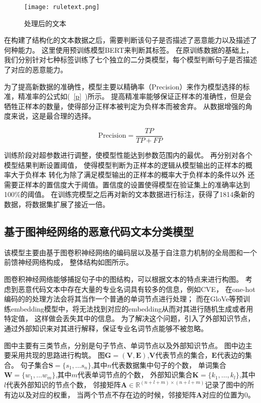 \begin{figure}[htb]
	\centering
	\texttt{[image: ruletext.png]}
	\caption{处理后的文本}
	\label{fig:ruletext}
\end{figure}

在构建了结构化的文本数据之后，需要判断该句子是否描述了恶意能力以及描述了何种能力。
这里使用预训练模型BERT来判断其标签。
在原训练数据的基础上，我们分别针对七种标签训练了七个独立的二分类模型，每个模型判断句子是否描述了对应的恶意能力。

为了提高新数据的准确性，模型主要以精确率（Precision）来作为模型选择的标准，精准率的公式如(~\ref{p}~)所示。
提高精准率能够保证正样本的准确性，但是会牺牲正样本的数量，使得部分正样本被判定为负样本而被舍弃。
从数据增强的角度来说，这是最合理的选择。

\begin{equation}
	\label{p}
	\text{Precision}=\frac{TP}{TP+FP}
\end{equation}

训练阶段对超参数进行调整，使模型性能达到参数范围内的最优。
再分别对各个模型结果判断设置阈值，
使得模型判断为正样本的逻辑从模型输出的正样本的概率大于负样本
转化为除了满足模型输出的正样本的概率大于负样本的条件以外
还需要正样本的置信度大于阈值。置信度的设置使得模型在验证集上的准确率达到100\%的阈值。
在训练完模型之后再对新的文本数据进行标注，获得了1814条新的数据，将数据集扩展了接近一倍。

\subsection{基于图神经网络的恶意代码文本分类模型}
该模型主要由基于图卷积神经网络的编码层以及基于自注意力机制的全局图和一个前馈神经网络构成，
整体结构如图所示。

图卷积神经网络能够捕捉句子中的图结构，可以根据文本的特点来进行构图。
考虑到恶意代码文本中存在大量的专业名词具有较多的信息，例如CVE，
在one-hot编码的的处理方法会将其当作一个普通的单词节点进行处理；
而在GloVe等预训练embedding模型中，将无法找到对应的embedding从而对其进行随机生成或者用特定值，
这样做会丢失其中的信息。
为了解决这个问题，引入了外部知识节点，通过外部知识来对其进行解释，保证专业名词节点能够不被忽略。

图中主要有三类节点，分别是句子节点、单词节点以及外部知识节点。
图中边主要采用共现的思路进行构筑。
图$\mathbf{G=(V,E)}$,$\mathbf{V}$代表节点的集合，$\mathbf{E}$代表边的集合。
句子集合$\mathbf{S}=\{s_1,…s_n\}$,其中$n$代表数据集中句子的个数，
单词集合$\mathbf{W}=\{w_1,…w_m\}$,其中$m$代表单词节点的个数，
外部知识集合$\mathbf{K}=\{k_1,…,k_l\}$,其中$l$代表外部知识的节点个数，
邻接矩阵$\mathbf{A} \in \mathbb{R}^{(n+l+m)×(n+l+m)}$记录了图中的所有边以及对应的权重，
当两个节点不存在边的时候，邻接矩阵$\mathbf{A}$对应的位置为0。

